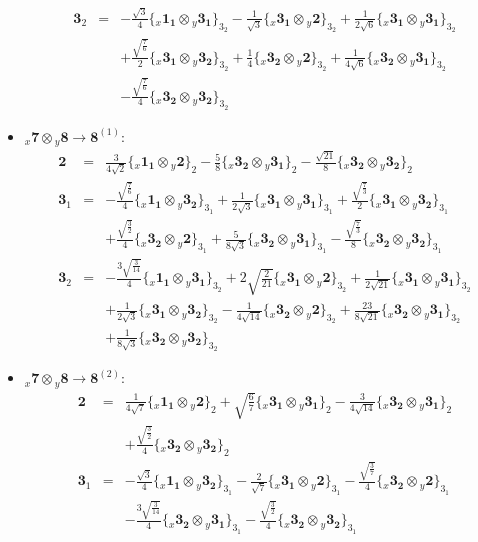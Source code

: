 \documentclass[english]{article}
\newcommand{\rep}[1]{\mathbf{#1}}
\newcommand{\repx}[2]{{}_{#2}\mathbf{#1}}
\newcommand{\subcg}[3]{\big\{ \repx{#1}{x}\otimes\repx{#2}{y}\big\}^{}_{#3}}
\begin{document}
\begin{itemize}
\begin{eqnarray*}
\\
\rep{3}_{2} &=& -\frac{\sqrt{3}}{4}\subcg{1_{1}}{3_{1}}{3_{2}}-\frac{1}{\sqrt{3}}\subcg{3_{1}}{2}{3_{2}}+\frac{1}{2 \sqrt{6}}\subcg{3_{1}}{3_{1}}{3_{2}} \\ 
 & & +\frac{\sqrt{\frac{7}{6}}}{2}\subcg{3_{1}}{3_{2}}{3_{2}}+\frac{1}{4}\subcg{3_{2}}{2}{3_{2}}+\frac{1}{4 \sqrt{6}}\subcg{3_{2}}{3_{1}}{3_{2}} \\ 
 & & -\frac{\sqrt{\frac{7}{6}}}{4}\subcg{3_{2}}{3_{2}}{3_{2}}
\end{eqnarray*}
\item $\repx{7}{x}\otimes\repx{8}{y}\to\rep{8}^{(1)}$:
\begin{eqnarray*}
\rep{2} &=& \frac{3}{4 \sqrt{2}}\subcg{1_{1}}{2}{2}-\frac{5}{8}\subcg{3_{2}}{3_{1}}{2}-\frac{\sqrt{21}}{8}\subcg{3_{2}}{3_{2}}{2}
\\
\rep{3}_{1} &=& -\frac{\sqrt{\frac{7}{6}}}{4}\subcg{1_{1}}{3_{2}}{3_{1}}+\frac{1}{2 \sqrt{3}}\subcg{3_{1}}{3_{1}}{3_{1}}+\frac{\sqrt{\frac{7}{3}}}{2}\subcg{3_{1}}{3_{2}}{3_{1}} \\ 
 & & +\frac{\sqrt{\frac{3}{2}}}{4}\subcg{3_{2}}{2}{3_{1}}+\frac{5}{8 \sqrt{3}}\subcg{3_{2}}{3_{1}}{3_{1}}-\frac{\sqrt{\frac{7}{3}}}{8}\subcg{3_{2}}{3_{2}}{3_{1}}
\\
\rep{3}_{2} &=& -\frac{3 \sqrt{\frac{3}{14}}}{4}\subcg{1_{1}}{3_{1}}{3_{2}}+2 \sqrt{\frac{2}{21}}\subcg{3_{1}}{2}{3_{2}}+\frac{1}{2 \sqrt{21}}\subcg{3_{1}}{3_{1}}{3_{2}} \\ 
 & & +\frac{1}{2 \sqrt{3}}\subcg{3_{1}}{3_{2}}{3_{2}}-\frac{1}{4 \sqrt{14}}\subcg{3_{2}}{2}{3_{2}}+\frac{23}{8 \sqrt{21}}\subcg{3_{2}}{3_{1}}{3_{2}} \\ 
 & & +\frac{1}{8 \sqrt{3}}\subcg{3_{2}}{3_{2}}{3_{2}}
\end{eqnarray*}
\item $\repx{7}{x}\otimes\repx{8}{y}\to\rep{8}^{(2)}$:
\begin{eqnarray*}
\rep{2} &=& \frac{1}{4 \sqrt{7}}\subcg{1_{1}}{2}{2}+\sqrt{\frac{6}{7}}\subcg{3_{1}}{3_{1}}{2}-\frac{3}{4 \sqrt{14}}\subcg{3_{2}}{3_{1}}{2} \\ 
 & & +\frac{\sqrt{\frac{3}{2}}}{4}\subcg{3_{2}}{3_{2}}{2}
\\
\rep{3}_{1} &=& -\frac{\sqrt{3}}{4}\subcg{1_{1}}{3_{2}}{3_{1}}-\frac{2}{\sqrt{7}}\subcg{3_{1}}{2}{3_{1}}-\frac{\sqrt{\frac{3}{7}}}{4}\subcg{3_{2}}{2}{3_{1}} \\ 
 & & -\frac{3 \sqrt{\frac{3}{14}}}{4}\subcg{3_{2}}{3_{1}}{3_{1}}-\frac{\sqrt{\frac{3}{2}}}{4}\subcg{3_{2}}{3_{2}}{3_{1}}
\\

\end{eqnarray*}
\end{itemize}
\end{document}
